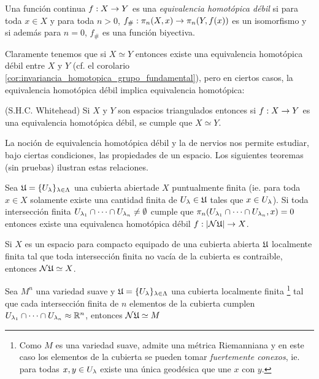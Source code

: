 \documentclass[../../topologia_algebraica]{subfiles}
\begin{document}
\begin{defin}
  Una funci\'on continua $f:X\rightarrow Y$ es una \emph{equivalencia homot\'opica d\'ebil} si para toda $x\in X$
  y para toda $n>0$, $f_{\#}:\pi_n(X,x)\rightarrow\pi_n(Y,f(x))$ es un isomorfismo y si adem\'as para $n=0$, $f_{\#}$
  es una funci\'on biyectiva.
\end{defin}

Claramente tenemos que si $X\simeq Y$ entonces existe una equivalencia homot\'opica d\'ebil entre $X$ y
$Y$ (cf. el corolario \ref{cor:invariancia_homotopica_grupo_fundamental}), pero en ciertos casos, la equivalencia
homot\'opica d\'ebil implica equivalencia homot\'opica:

\begin{thm}(S.H.C. Whitehead)
  Si $X$ y $Y$ son espacios triangulados entonces si $f:X\rightarrow Y$ es una equivalencia homot\'opica d\'ebil,
  se cumple que $X\simeq Y$.
\end{thm}

La noci\'on de equivalencia homot\'opica d\'ebil y la de nervios nos permite estudiar, bajo ciertas condiciones, las
propiedades de un espacio. Los siguientes teoremas (sin pruebas) ilustran estas relaciones.

\begin{thm}
  Sea $\mathfrak{U}=\{U_{\lambda}\}_{\lambda\in\Lambda}$ una cubierta abiertade $X$ puntualmente finita (ie. para toda $x\in X$
  solamente existe una cantidad finita de $U_{\lambda}\in\mathfrak{U}$ tales que $x\in U_{\lambda}$). Si toda intersecci\'on finita
  $U_{\lambda_1}\cap\cdots\cap U_{\lambda_n}\neq \emptyset$ cumple que $\pi_n(U_{\lambda_1}\cap\cdots\cap U_{\lambda_n},x)=0$
  entonces existe una equivalenca homot\'opica d\'ebil $f:\left| \mathcal{N}\mathfrak{U} \right|\rightarrow X$.
\end{thm}

\begin{thm}
  Si $X$ es un espacio para compacto equipado de una cubierta abierta $\mathfrak{U}$ localmente
  finita tal que toda intersecci\'on finita no vac\'ia de la cubierta es contraible, entonces $\mathcal{N}\mathfrak{U}\simeq X$.
\end{thm}

\begin{thm}
  Sea $M^n$ una variedad suave y $\mathfrak{U}=\{U_{\lambda}\}_{\lambda\in\Lambda}$ una cubierta localmente finita%
  \footnote{Como $M$ es una variedad suave, admite una m\'etrica Riemanniana y en este caso los elementos de
  la cubierta se pueden tomar \emph{fuertemente conexos}, ie. para todas $x,y\in U_{\lambda}$ existe una \'unica geod\'esica
  que une $x$ con $y$.}
  tal que cada intersecci\'on finita de $n$ elementos de la cubierta cumplen
  $U_{\lambda_1}\cap\cdots\cap U_{\lambda_n}\approx\mathbb{R}^n$, entonces $\mathcal{N}\mathfrak{U}\simeq M$
\end{thm}
\end{document}
